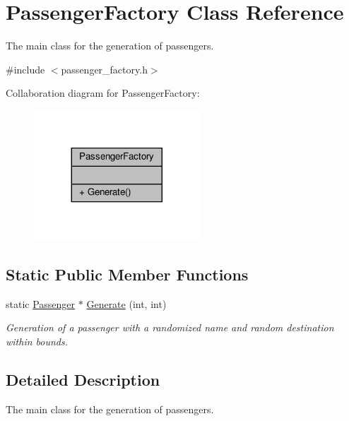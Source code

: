 \hypertarget{classPassengerFactory}{}\section{Passenger\+Factory Class Reference}
\label{classPassengerFactory}


The main class for the generation of passengers.  




{\ttfamily \#include $<$passenger\+\_\+factory.\+h$>$}



Collaboration diagram for Passenger\+Factory\+:
\nopagebreak
\begin{figure}[H]
\begin{center}
\leavevmode
\includegraphics[width=176pt]{classPassengerFactory__coll__graph}
\end{center}
\end{figure}
\subsection*{Static Public Member Functions}
\begin{DoxyCompactItemize}
\item 
static \hyperlink{classPassenger}{Passenger} $\ast$ \hyperlink{classPassengerFactory_a2952ba78ceb285f445bc768d287230d2}{Generate} (int, int)
\begin{DoxyCompactList}\small\item\em Generation of a passenger with a randomized name and random destination within bounds. \end{DoxyCompactList}\end{DoxyCompactItemize}


\subsection{Detailed Description}
The main class for the generation of passengers. 

